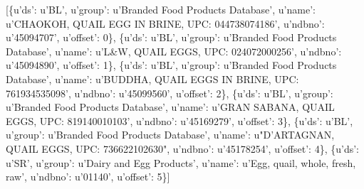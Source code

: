 \documentclass[11pt]{article}
\newenvironment{Shaded}{}{}
\newcommand{\DecValTok}[1]{\textcolor[rgb]{0.25,0.63,0.44}{{#1}}}
\newcommand{\StringTok}[1]{\textcolor[rgb]{0.25,0.44,0.63}{{#1}}}
\newcommand{\NormalTok}[1]{{#1}}
\begin{document}
\begin{Shaded}
\begin{Highlighting}[]
\NormalTok{[\{}\StringTok{u'ds'}\NormalTok{: }\StringTok{u'BL'}\NormalTok{,}
  \StringTok{u'group'}\NormalTok{: }\StringTok{u'Branded Food Products Database'}\NormalTok{,}
  \StringTok{u'name'}\NormalTok{: }\StringTok{u'CHAOKOH, QUAIL EGG IN BRINE, UPC: 044738074186'}\NormalTok{,}
  \StringTok{u'ndbno'}\NormalTok{: }\StringTok{u'45094707'}\NormalTok{,}
  \StringTok{u'offset'}\NormalTok{: }\DecValTok{0}\NormalTok{\},}
\NormalTok{ \{}\StringTok{u'ds'}\NormalTok{: }\StringTok{u'BL'}\NormalTok{,}
  \StringTok{u'group'}\NormalTok{: }\StringTok{u'Branded Food Products Database'}\NormalTok{,}
  \StringTok{u'name'}\NormalTok{: }\StringTok{u'L&W, QUAIL EGGS, UPC: 024072000256'}\NormalTok{,}
  \StringTok{u'ndbno'}\NormalTok{: }\StringTok{u'45094890'}\NormalTok{,}
  \StringTok{u'offset'}\NormalTok{: }\DecValTok{1}\NormalTok{\},}
\NormalTok{ \{}\StringTok{u'ds'}\NormalTok{: }\StringTok{u'BL'}\NormalTok{,}
  \StringTok{u'group'}\NormalTok{: }\StringTok{u'Branded Food Products Database'}\NormalTok{,}
  \StringTok{u'name'}\NormalTok{: }\StringTok{u'BUDDHA, QUAIL EGGS IN BRINE, UPC: 761934535098'}\NormalTok{,}
  \StringTok{u'ndbno'}\NormalTok{: }\StringTok{u'45099560'}\NormalTok{,}
  \StringTok{u'offset'}\NormalTok{: }\DecValTok{2}\NormalTok{\},}
\NormalTok{ \{}\StringTok{u'ds'}\NormalTok{: }\StringTok{u'BL'}\NormalTok{,}
  \StringTok{u'group'}\NormalTok{: }\StringTok{u'Branded Food Products Database'}\NormalTok{,}
  \StringTok{u'name'}\NormalTok{: }\StringTok{u'GRAN SABANA, QUAIL EGGS, UPC: 819140010103'}\NormalTok{,}
  \StringTok{u'ndbno'}\NormalTok{: }\StringTok{u'45169279'}\NormalTok{,}
  \StringTok{u'offset'}\NormalTok{: }\DecValTok{3}\NormalTok{\},}
\NormalTok{ \{}\StringTok{u'ds'}\NormalTok{: }\StringTok{u'BL'}\NormalTok{,}
  \StringTok{u'group'}\NormalTok{: }\StringTok{u'Branded Food Products Database'}\NormalTok{,}
  \StringTok{u'name'}\NormalTok{: }\StringTok{u"D'ARTAGNAN, QUAIL EGGS, UPC: 736622102630"}\NormalTok{,}
  \StringTok{u'ndbno'}\NormalTok{: }\StringTok{u'45178254'}\NormalTok{,}
  \StringTok{u'offset'}\NormalTok{: }\DecValTok{4}\NormalTok{\},}
\NormalTok{ \{}\StringTok{u'ds'}\NormalTok{: }\StringTok{u'SR'}\NormalTok{,}
  \StringTok{u'group'}\NormalTok{: }\StringTok{u'Dairy and Egg Products'}\NormalTok{,}
  \StringTok{u'name'}\NormalTok{: }\StringTok{u'Egg, quail, whole, fresh, raw'}\NormalTok{,}
  \StringTok{u'ndbno'}\NormalTok{: }\StringTok{u'01140'}\NormalTok{,}
  \StringTok{u'offset'}\NormalTok{: }\DecValTok{5}\NormalTok{\}]}
\end{Highlighting}
\end{Shaded}
\end{document}
